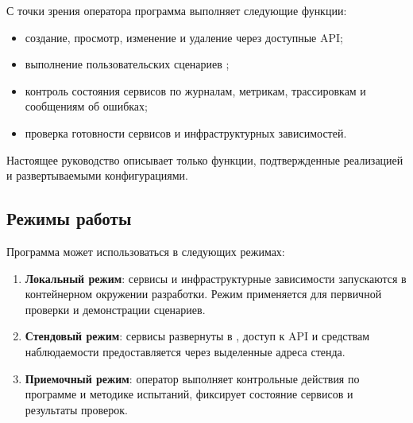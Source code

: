 \documentclass[12pt,a4paper]{extarticle}
\begin{document}
\begin{hseExample}
С точки зрения оператора программа выполняет следующие функции:

\begin{itemize}[leftmargin=1.25cm]
    \item создание, просмотр, изменение и удаление  через доступные API;
    \item выполнение пользовательских сценариев ;
    \item контроль состояния сервисов по журналам, метрикам, трассировкам и сообщениям об ошибках;
    \item проверка готовности сервисов и инфраструктурных зависимостей.
\end{itemize}

Настоящее руководство описывает только функции, подтвержденные реализацией и развертываемыми конфигурациями.
\end{hseExample}

\subsection{Режимы работы}

\begin{hseExample}
Программа может использоваться в следующих режимах:

\begin{enumerate}[label=\arabic*), leftmargin=1.25cm]
    \item \textbf{Локальный режим}: сервисы и инфраструктурные зависимости запускаются в контейнерном окружении разработки. Режим применяется для первичной проверки и демонстрации сценариев.
    \item \textbf{Стендовый режим}: сервисы развернуты в , доступ к API и средствам наблюдаемости предоставляется через выделенные адреса стенда.
    \item \textbf{Приемочный режим}: оператор выполняет контрольные действия по программе и методике испытаний, фиксирует состояние сервисов и результаты проверок.
\end{enumerate}
\end{hseExample}

\clearpage
\end{document}
